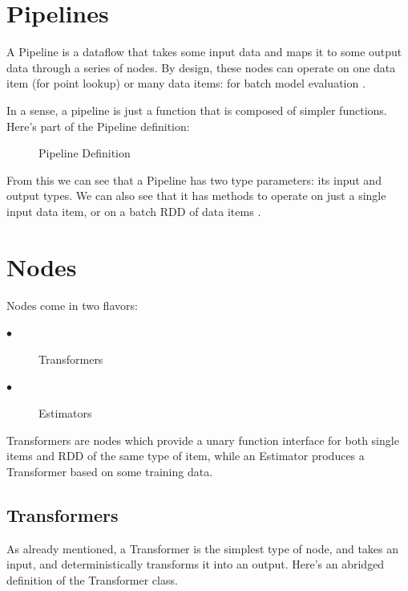 \documentclass[9pt,twocolumn,twoside]{styles/osajnl}
\begin{document}
\section{Pipelines}

A Pipeline is a dataflow that takes some input data and maps it to
some output data through a series of nodes. By design, these nodes can
operate on one data item (for point lookup) or many data items: for
batch model evaluation \cite{www-keystoneml1} .

In a sense, a pipeline is just a function that is composed of simpler
functions. Here’s part of the Pipeline definition:

\begin{figure}[htbp]
\centering
{}
\caption{Pipeline Definition}
\label{fig:Pipeline Definition}
\end{figure}



From this we can see that a Pipeline has two type parameters: its
input and output types. We can also see that it has methods to operate
on just a single input data item, or on a batch RDD of data items \cite{www-keystoneml1} .

\section{Nodes}

Nodes come in two flavors:

\begin{description}
\item[$\bullet$] Transformers
\item[$\bullet$] Estimators
\end{description}

Transformers are nodes which provide a unary function interface for
both single items and RDD of the same type of item, while an Estimator
produces a Transformer based on some training data.
\subsection{Transformers}

As already mentioned, a Transformer is the simplest type of node, and
takes an input, and deterministically transforms it into an
output. Here’s an abridged definition of the Transformer class.
\end{document}
